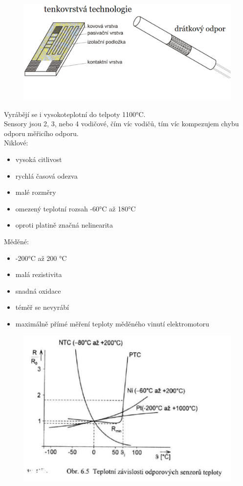 \begin{figure}[H]
    \includegraphics*[scale = 0.25]{img/odporoveSnimacePlatina.png}
\end{figure}
Vyrábějí se i vysokoteplotní do telpoty 1100°C.\\
Sensory jsou 2, 3, nebo 4 vodičové, čím víc vodičů, tím víc kompezujem chybu odporu měřicího odporu.\\

Niklové:
\begin{itemize}
    \item vysoká citlivost 
    \item rychlá časová odezva 
    \item malé rozměry 
    \item omezený teplotní rozsah -60°C až 180°C 
    \item oproti platině značná nelinearita 
\end{itemize}

Měděné:
\begin{itemize}
    \item -200°C až 200 °C
    \item malá rezistivita
    \item snadná oxidace
    \item téměř se nevyrábí
    \item maximálně přímé měření teploty měděného vinutí elektromotoru
\end{itemize}
\begin{figure}[H]
    \includegraphics*[scale = 0.7]{img/odporoveSnimaceGrafy.png}
\end{figure}

